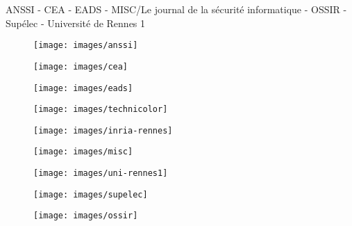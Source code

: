 \begin{center}
ANSSI -  CEA - EADS - MISC/Le journal de la s{\'e}curit{\'e} informatique - OSSIR - Sup\'elec - Universit\'e de Rennes 1
\end{center}

\begin{figure}[h]
\begin{center}
\parbox{3cm}{\texttt{[image: images/anssi]}}
\hfill
\parbox{3cm}{\texttt{[image: images/cea]}}
\hfill
\parbox{3cm}{\texttt{[image: images/eads]}}
\end{center}
\vfill
\begin{center}
\parbox{3cm}{\texttt{[image: images/technicolor]}}
\hfill
\parbox{3cm}{\texttt{[image: images/inria-rennes]}}
\hfill
\parbox{3cm}{\texttt{[image: images/misc]}}
\end{center}
\vfill
\begin{center}
\parbox{3cm}{\texttt{[image: images/uni-rennes1]}}
\hfill
\parbox{3cm}{\texttt{[image: images/supelec]}}
\hfill
\parbox{3cm}{\texttt{[image: images/ossir]}}
\end{center}
\vfill
\begin{center}
\end{center}
\end{figure}

